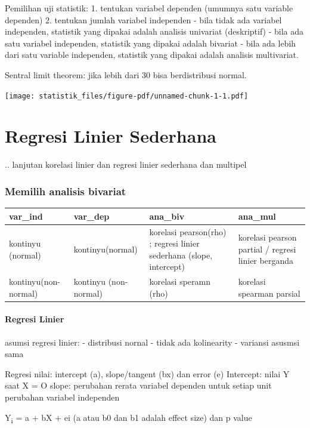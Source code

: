 \documentclass[
  letterpaper,
  DIV=11,
  numbers=noendperiod]{scrreprt}
\let\oldparagraph\paragraph
\renewcommand{\paragraph}[1]{\oldparagraph{#1}\mbox{}}
\begin{document}
Pemilihan uji statistik: 1. tentukan variabel dependen (umumnya satu
variable dependen) 2. tentukan jumlah variabel independen - bila tidak
ada variabel independen, statistik yang dipakai adalah analisis
univariat (deskriptif) - bila ada satu variabel independen, statistik
yang dipakai adalah bivariat - bila ada lebih dari satu variable
independen, statistik yang dipakai adalah analisis multivariat.

Sentral limit theorem: jika lebih dari 30 bisa berdistribusi normal.

\texttt{[image: statistik\_files/figure-pdf/unnamed-chunk-1-1.pdf]}

\section{Regresi Linier Sederhana}\label{regresi-linier-sederhana}

.. lanjutan korelasi linier dan regresi linier sederhana dan multipel

\subsubsection{Memilih analisis
bivariat}\label{memilih-analisis-bivariat}

\begin{longtable*}{llll}
\toprule
var\_ind & var\_dep & ana\_biv & ana\_mul \\ 
\midrule\addlinespace[2.5pt]
kontinyu (normal) & kontinyu(normal) & korelasi pearson(rho) ; regresi linier sederhana (slope, intercept) & korelasi pearson partial / regresi linier berganda \\ 
kontinyu(non-normal) & kontinyu (non-normal) & korelasi speramn (rho) & korelasi spearman parsial \\ 
\bottomrule
\end{longtable*}

\paragraph{Regresi Linier}\label{regresi-linier}

asumsi regresi linier: - distribusi nornal - tidak ada kolinearity -
variansi asusmsi sama

Regresi nilai: intercept (a), slope/tangent (bx) dan error (e)
Intercept: nilai Y saat X = O slope: perubahan rerata variabel dependen
untuk setiap unit perubahan variabel independen

Y\textsubscript{i} = a + bX + ei (a atau b0 dan b1 adalah effect size)
dan p value
\end{document}
